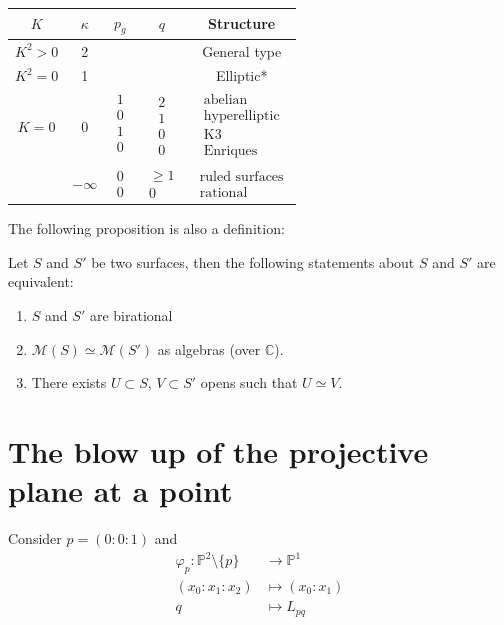 \begin{center}\begin{tabular}{c|c|c|c|c}
$K$ & $\kappa$ & $p_g$ &  $q$  & Structure\\
\hline\hline
$K^2>0$&2&&&General type\\ \hline
$K^2=0$&1&&&Elliptic*\\\hline
$K=0$&0&
$\substack{1\\0\\1\\0 \\ }$&
$\substack{2 \\1\\0\\0 }$
&$\substack{
\text{abelian} \\
\text{hyperelliptic}\\
\text{K3}\\
\text{Enriques}}$\\\hline
&$-\infty$&$\substack{0 \\ 0}$&
$\substack{\geq 1 \\ 0}$&
$\substack{\text{ruled surfaces} \\
\text{rational}}$
\end{tabular}\end{center}

\medskip\noindent
The following proposition is also a
definition:

\begin{proposition}
\label{proposition-birational}
Let $S$ and $S'$ be two surfaces, then the
following
statements about $S$ and $S'$ are equivalent:
\begin{enumerate}
\item $S$ and $S'$ are birational
\item $\mathcal{M}(S)\simeq \mathcal{M}(S')$
as algebras (over $\mathbb{C}$).
\item There exists $U \subset S$, $V \subset
S'$
opens such that $U \simeq V$.
\end{enumerate}
\end{proposition}

\section{The blow up of the projective plane
at a point}
\label{section-blow-up}

\noindent
Consider $p=(0:0:1)$ and
$$
\begin{aligned}
\varphi_p: \mathbb{P}^2\setminus \{p\}
&\longrightarrow \mathbb{P}^1 \\
(x_0:x_1:x_2) &\longmapsto (x_0:x_1)\\
q &  \longmapsto L_{pq}
\end{aligned}
$$

